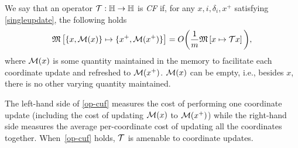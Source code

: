 \begin{definition}[CF operator]
 We say that an operator ${\mathcal{T}}:\mathbb{H}\to\mathbb{H}$ is \emph{CF} if, for any $x,i,\delta_i,x^+$ satisfying \eqref{singleupdate}, the following holds 
\begin{equation}\label{op-cuf} \nops{\{x,\cM(x)\}}{\{x^+,\cM(x^+)\}}= O\bigg(\frac{1}{m}\nops{x}{\cT x}\bigg),
\end{equation}
where ${\mathcal{M}}(x)$ is some quantity maintained in the memory to facilitate each coordinate update and refreshed to ${\mathcal{M}}(x^+)$. ${\mathcal{M}}(x)$ can be empty, i.e., besides $x$, there is no other varying quantity maintained.
\end{definition}


The left-hand side of \eqref{op-cuf} measures the cost of performing one coordinate update (including the cost of updating ${\mathcal{M}}(x)$ to ${\mathcal{M}}(x^+)$)  while the right-hand side measures the average per-coordinate cost of updating all the coordinates together. When~\eqref{op-cuf} holds, ${\mathcal{T}}$ is amenable to coordinate updates.

